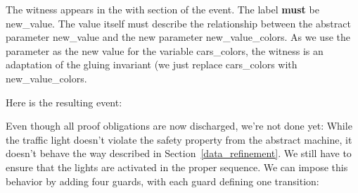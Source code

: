The witness appears in the \textsf{with} section of the event.  The label \textbf{must} be \textsf{new\_value}.  The value itself must describe the relationship between the abstract parameter \textsf{new\_value} and the new parameter \textsf{new\_value\_colors}.  As we use the parameter as the new value for the variable \textsf{cars\_colors}, the witness is an adaptation of the gluing invariant (we just replace \textsf{cars\_colors} with \textsf{new\_value\_colors}.


Here is the resulting event:


Even though all proof obligations are now discharged, we're not done yet: While the traffic light doesn't violate the safety property from the abstract machine, it doesn't behave the way described in Section~\ref{data_refinement}.  We still have to ensure that the lights are activated in the proper sequence.  We can impose this behavior by adding four guards, with each guard defining one transition:


